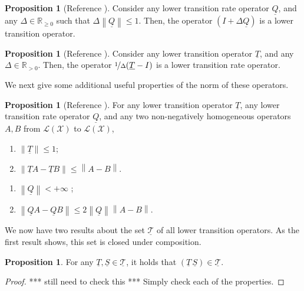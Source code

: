 \documentclass[10pt,a4paper]{paper}
\theoremstyle{definition}
\newtheorem{proposition}[theorem]{Proposition}
\newcommand{\reals}{\mathbb{R}}
\newcommand{\realspos}{\reals_{>0}}
\newcommand{\realsnonneg}{\reals_{\geq 0}}
\newcommand{\states}{\mathcal{X}}
\newcommand{\lt}{\underline{T}}
\newcommand{\gambles}{\mathcal{L}}
\newcommand{\gamblesX}{\gambles(\states)}
\newcommand{\lrate}{\underline{Q}}
\newcommand{\norm}[1]{\left\lVert #1 \right\rVert}
\begin{document}

\begin{proposition}[Reference \cite{DeBock:2016}]\label{lemma:normQsmallenough}
Consider any lower transition rate operator $\lrate$, and any $\Delta\in\realsnonneg$ such that $\Delta\norm{\lrate}\leq 1$. Then, the operator $(I+\Delta\lrate)$ is a lower transition operator.
\end{proposition}

\begin{proposition}[Reference \cite{DeBock:2016}]\label{lemma:lower_trans_to_lower_rate}
Consider any lower transition operator $\lt$, and any $\Delta\in\realspos$. Then, the operator $\nicefrac{1}{\Delta}(\lt - I)$ is a lower transition rate operator.
\end{proposition}

\noindent We next give some additional useful properties of the norm of these operators.

\begin{proposition}[Reference \cite{DeBock:2016}]\label{prop:norm_properties_lrate_lt}
For any lower transition operator $\lt$, any lower transition rate operator $\lrate$, and any two non-negatively homogeneous operators $A,B$ from $\gamblesX$ to $\gamblesX$,
\begin{multicols}{2}
\begin{enumerate}[label=LT\arabic*:,ref=LT\arabic*,start=4]
\item
$\norm{\lt} \leq 1$; \label{LT:norm_at_most_one}
\item
$\norm{\lt A - \lt B} \leq \norm{A - B}$. \label{LT:differencenorm}
\end{enumerate}
\begin{enumerate}[label=LR\arabic*:,ref=LR\arabic*,start=5]
\item
$\norm{\lrate} < +\infty$ \label{LR:normlratefinite};
\item
$\norm{\lrate A - \lrate B} \leq 2\norm{\lrate}\norm{A - B}.$ \label{LR:differenceofnorm}
\end{enumerate}
\end{multicols}
\end{proposition}

We now have two results about the set $\underline{\mathcal{T}}$ of all lower transition operators. As the first result shows, this set is closed under composition.
\begin{proposition}\label{lemma:compositioncoherence}
For any $\lt,\underline{S}\in\underline{\mathcal{T}}$, it holds that $\left(\lt\,\underline{S}\right)\in\underline{\mathcal{T}}$.
\end{proposition}
\begin{proof}
*** still need to check this *** Simply check each of the properties.
\end{proof}
\end{document}
